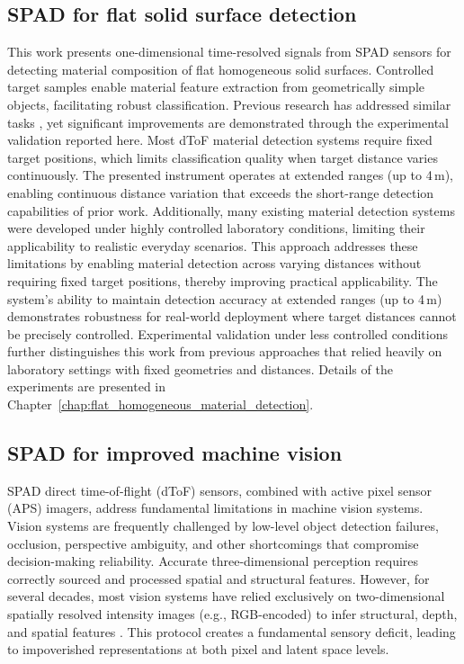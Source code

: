 \documentclass[12pt,a4paper,oneside]{report}
\begin{document}
\subsection{SPAD for flat solid surface detection}
\label{subsec:spad_flat_solid}
This work presents one-dimensional time-resolved signals from SPAD sensors for detecting material composition of flat homogeneous solid surfaces. Controlled target samples enable material feature extraction from geometrically simple objects, facilitating robust classification. Previous research has addressed similar tasks \cite{tachella2019,becker2023}, yet significant improvements are demonstrated through the experimental validation reported here. Most dToF material detection systems require fixed target positions, which limits classification quality when target distance varies continuously. The presented instrument operates at extended ranges (up to 4\,m), enabling continuous distance variation that exceeds the short-range detection capabilities of prior work. Additionally, many existing material detection systems were developed under highly controlled laboratory conditions, limiting their applicability to realistic everyday scenarios. This approach addresses these limitations by enabling material detection across varying distances without requiring fixed target positions, thereby improving practical applicability. The system's ability to maintain detection accuracy at extended ranges (up to 4\,m) demonstrates robustness for real-world deployment where target distances cannot be precisely controlled. Experimental validation under less controlled conditions further distinguishes this work from previous approaches that relied heavily on laboratory settings with fixed geometries and distances. Details of the experiments are presented in Chapter~\ref{chap:flat_homogeneous_material_detection}.

\subsection{SPAD for improved machine vision}
\label{subsec:spad_improved_vision}
SPAD direct time-of-flight (dToF) sensors, combined with active pixel sensor (APS) imagers, address fundamental limitations in machine vision systems. Vision systems are frequently challenged by low-level object detection failures, occlusion, perspective ambiguity, and other shortcomings that compromise decision-making reliability. Accurate three-dimensional perception requires correctly sourced and processed spatial and structural features. However, for several decades, most vision systems have relied exclusively on two-dimensional spatially resolved intensity images (e.g., RGB-encoded) to infer structural, depth, and spatial features \cite{marr2010}. This protocol creates a fundamental sensory deficit, leading to impoverished representations at both pixel and latent space levels.
\end{document}

